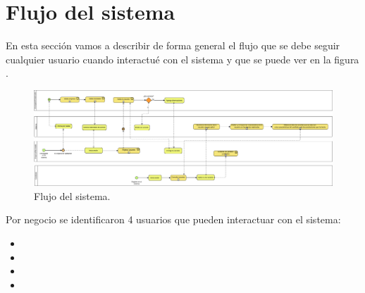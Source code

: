 \clearpage
\section{Flujo del sistema}
En esta sección vamos a describir de forma general el flujo que se debe seguir cualquier usuario cuando interactué con el sistema y que se puede ver en la figura .
\begin{figure}[H]
    \begin{center}
        \includegraphics[height=0.27\textheight,angle=90]{propuesta/imagenes/Flujo.png}
    \end{center}
    \caption{Flujo del sistema.}
    \label{mark:top}
\end{figure}


Por negocio se identificaron 4 usuarios que pueden interactuar con el sistema:
\begin{itemize}
    \item {}
    \item {}
    \item {}
    \item {}
\end{itemize} 

